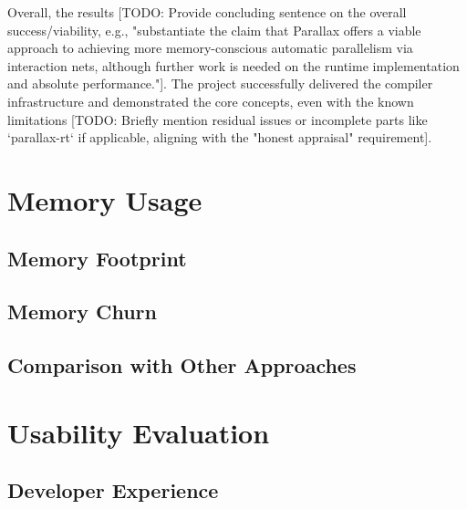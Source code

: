 Overall, the results [TODO: Provide concluding sentence on the overall success/viability, e.g., "substantiate the claim that Parallax offers a viable approach to achieving more memory-conscious automatic parallelism via interaction nets, although further work is needed on the runtime implementation and absolute performance."]. The project successfully delivered the compiler infrastructure and demonstrated the core concepts, even with the known limitations [TODO: Briefly mention residual issues or incomplete parts like `parallax-rt` if applicable, aligning with the "honest appraisal" requirement].


\section{Memory Usage}

\subsection{Memory Footprint}

\subsection{Memory Churn}

\subsection{Comparison with Other Approaches}

\section{Usability Evaluation}

\subsection{Developer Experience}

